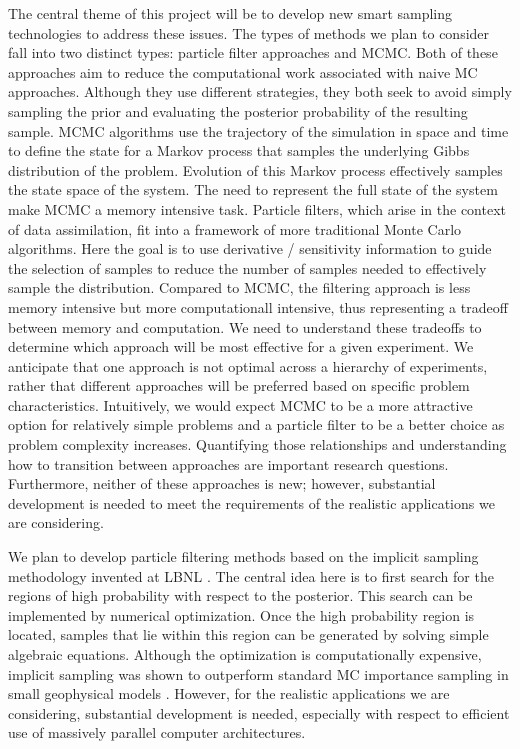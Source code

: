 \documentclass[11pt]{article}
\begin{document}
The central theme of this project will be to develop new smart sampling technologies 
to address these issues.
The types of methods we plan to consider fall into two distinct types:  particle filter approaches
and MCMC.
Both of these approaches aim to reduce the computational work associated with naive MC approaches.
Although they use different strategies, they both seek to avoid simply sampling the prior and evaluating
the posterior probability of the resulting sample. 
MCMC algorithms use the trajectory of the simulation in space and time to define the state for a Markov
process that samples the underlying Gibbs distribution of the problem.  Evolution of this Markov process
effectively samples the state space of the system.  The need to represent the full state of the system
make MCMC a memory intensive task.
Particle filters, which arise in the context of data assimilation,
fit into a framework of more traditional Monte Carlo algorithms.  Here the goal is to use
derivative / sensitivity information to guide the selection of samples to reduce the number of samples
needed to effectively sample the distribution.
Compared to MCMC, the filtering approach is less memory intensive but more computationall intensive, thus representing
a tradeoff between memory and computation.
We need to understand these tradeoffs to determine which approach will be most effective for a given
experiment.  We anticipate that one approach is not optimal across a hierarchy of experiments, rather
that different approaches will be preferred based on specific problem characteristics.  Intuitively,
we would expect MCMC to be a more attractive option for relatively simple problems and a particle
filter to be a better choice as problem complexity increases. Quantifying those relationships
and understanding how to transition between approaches are important research questions.
Furthermore, neither of these approaches is new; however, substantial development is needed to meet the requirements
of the realistic applications we are considering.

We plan to develop particle filtering methods based on the implicit sampling methodology invented at LBNL \cite{chorintupnas,chorin2010,Morzfeld2011,Morzfeld2012,Atkins2013}.
The central idea here is to first search for the regions of high probability with respect to the posterior.
This search can be implemented by numerical optimization.
Once the high probability region is located, samples that lie within this region can be generated by solving simple algebraic equations.
Although the optimization is computationally expensive, implicit sampling was shown to outperform standard MC importance sampling in small geophysical models \cite{Morzfeld2011,Morzfeld2012,Atkins2013}. 
However, for the realistic applications we are considering, substantial development is needed, especially with respect to efficient use of massively parallel computer architectures. 
\end{document}
